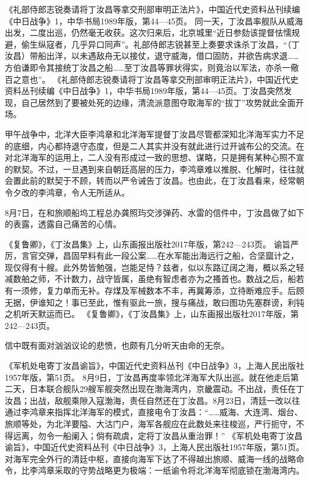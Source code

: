 \documentclass[12pt,UTF8]{ctexbook}
\begin{document}
《礼部侍郎志锐奏请将丁汝昌等拿交刑部审明正法片》，中国近代史资料丛刊续编《中日战争》1，中华书局1989年版，第44—45页。
同一天，丁汝昌率舰队从威海出发，二度出巡，仍然毫无收获。这次归来后，北京城里“近日参劾该提督怯懦规避，偷生纵寇者，几乎异口同声”。礼部侍郎志锐甚至上奏要求诛杀丁汝昌，“（丁汝昌）带船出洋，以未遇敌舟无以接仗，退守威海，借口固防，并欲告病求退……方伯谦即令其接统丁汝昌之船……至丁汝昌等罪状得实，则竟治以军法，亦杀一儆百之意也”。 《礼部侍郎志锐奏请将丁汝昌等拿交刑部审明正法片》，中国近代史资料丛刊续编《中日战争》1，中华书局1989年版，第44—45页。丁汝昌突然发现，自己居然到了要被处死的边缘，清流派意图夺取海军的“拔丁”攻势就此全面开场。

甲午战争中，北洋大臣李鸿章和北洋海军提督丁汝昌尽管都深知北洋海军实力不足的底细，内心都持退守态度，但是二人其实并没有就此进行过开诚布公的交流。在对北洋海军的运用上，二人没有形成过一致的思想、谋略，只是拥有某种心照不宣的默契。不过，一旦遇到来自朝廷高层的压力，李鸿章难以推脱、化解时，往往就会置此前的默契于不顾，转而以严令诫告丁汝昌。也由此，在丁汝昌看来，经常朝令夕改的李鸿章，令人无所适从。

8月7日，在和旅顺船坞工程总办龚照玙交涉弹药、水雷的信件中，丁汝昌做了如下的表露，透露自己痛苦的心情。

《复鲁卿》，《丁汝昌集》上，山东画报出版社2017年版，第242—243页。
谕旨严厉，言官交弹，昌固早料有此一段公案……在水军能出海远行之船，合坚窳计之，现仅得有十艘。此外势皆勉强，岂能足恃？兹者，似以东路辽阔之海，概以系之轻减数舶之师，不计数力，战守皆属，虽绝有智虑者亦为之搔首也。数战之后，船若有一须修，复力单而无补。存煤及军械数本不丰，再冀筹添，立待断难应手。后顾无据，伊谁知之！事已至此，惟有驱此一旅，搜与痛战，敢曰图功先塞群谤，利钝之机听天默运而已。 《复鲁卿》，《丁汝昌集》上，山东画报出版社2017年版，第242—243页。

信中既有面对汹汹议论的悲愤，也颇有几分听天由命的无奈。

《军机处电寄丁汝昌谕旨》，中国近代史资料丛刊《中日战争》3，上海人民出版社1957年版，第51页。
8月9日，丁汝昌再度率领北洋海军大队出巡。就在他走后第二天，日本联合舰队29艘军舰突然出现在渤海湾内，京畿震动。不出战，责任在丁汝昌；出战，敌舰乘隙入寇渤海，责任自然还在丁汝昌。8月23日，清廷一改以往通过李鸿章来指挥北洋海军的模式，直接电令丁汝昌：“……威海、大连湾、烟台、旅顺等处，为北洋要隘、大沽门户，海军各舰应在此数处来往梭巡，严行扼守，不得远离，勿令一船阑入；倘有疏虞，定将丁汝昌从重治罪！” 《军机处电寄丁汝昌谕旨》，中国近代史资料丛刊《中日战争》3，上海人民出版社1957年版，第51页。对海军完全外行的清廷中枢，直接向海军下达了不得越出旅顺、威海一线的战略命令，比李鸿章采取的守势战略更为极端：一纸谕令将北洋海军彻底锁在渤海湾内。
\end{document}
